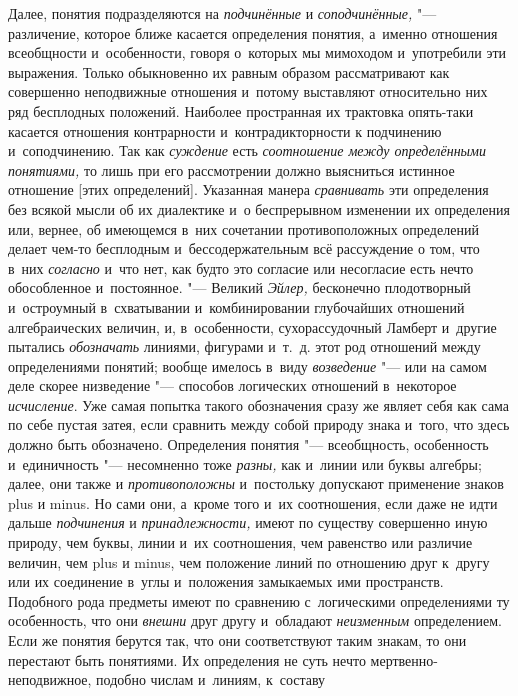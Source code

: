 Далее, понятия подразделяются на {\em подчинённые} и {\em соподчинённые,} "---
различение, которое ближе касается определения понятия, а~именно отношения
всеобщности и~особенности, говоря о~которых мы мимоходом и~употребили эти
выражения.
Только обыкновенно их равным образом
рассматривают как совершенно неподвижные отношения и~потому выставляют
относительно них ряд бесплодных положений. Наиболее пространная их
трактовка опять-таки касается отношения контрарности и~контрадикторности к
подчинению и~соподчинению. Так как {\em суждение} есть {\em соотношение между
определёнными понятиями,} то лишь при его рассмотрении должно выясниться
истинное отношение [этих определений]. Указанная манера {\em сравнивать} эти
определения без всякой мысли об их диалектике и~о беспрерывном изменении их
определения или, вернее, об имеющемся в~них сочетании противоположных
определений делает чем-то бесплодным и~бессодержательным всё рассуждение о
том, что в~них {\em согласно} и~что нет, как будто это согласие или несогласие
есть нечто обособленное и~постоянное. "--- Великий {\em Эйлер,} бесконечно
плодотворный и~остроумный в~схватывании и~комбинировании глубочайших
отношений алгебраических величин, и, в~особенности, сухорассудочный Ламберт
и~другие пытались {\em обозначать} линиями, фигурами и~т.~д. этот род отношений
между определениями понятий; вообще имелось в~виду {\em возведение} "--- или на
самом деле скорее низведение "--- способов логических отношений в~некоторое
{\em исчисление}. Уже самая попытка такого обозначения сразу же являет себя
как сама по себе пустая затея, если сравнить между собой природу знака и~того,
что здесь должно быть обозначено. Определения понятия "--- всеобщность,
особенность и~единичность "--- несомненно тоже {\em разны,} как и~линии или
буквы алгебры; далее, они также и {\em противоположны} и~постольку допускают
применение знаков plus и minus. Но сами они, а~кроме того и~их соотношения,
если даже не идти дальше {\em подчинения} и {\em принадлежности,} имеют по
существу совершенно иную природу, чем буквы, линии и~их соотношения, чем
равенство или различие величин, чем plus и minus, чем положение линий по
отношению друг к~другу или их соединение в~углы и~положения замыкаемых ими
пространств. Подобного рода предметы имеют по сравнению с~логическими
определениями ту особенность, что они {\em внешни} друг другу и~обладают {\em
неизменным} определением. Если же понятия берутся так, что они
соответствуют таким знакам, то они перестают быть понятиями. Их определения
не суть нечто мертвенно-неподвижное, подобно числам и~линиям, к~составу
